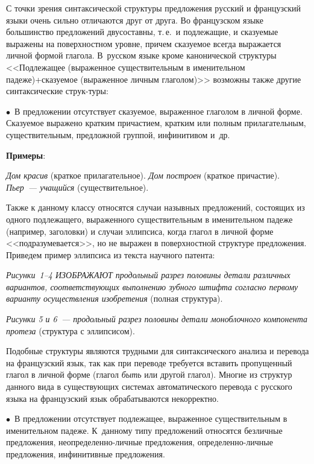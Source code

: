 \begin{multicols}{2}
     С точки зрения синтаксической структуры предложения русский и 
французский языки очень сильно отличаются друг от друга. Во французском 
языке большинство предложений двусоставны, т.\,е.\ и подлежащие, и 
сказуемые выражены на поверхностном уров\-не, причем сказуемое всегда 
выражается личной формой глагола. В~рус\-ском языке кроме канонической 
структуры <<Подлежащее (выраженное существительным в именительном 
падеже)\;+\;сказуемое (выраженное личным глаголом)>> возможны также 
другие синтаксические струк-\linebreak туры:
       
       $\bullet$~В предложении отсутствует сказуемое, выраженное глаголом в личной 
форме. Сказуемое выражено кратким причастием, кратким или полным прилагательным, 
существительным, предложной группой, инфинитивом и~др.
     
     \smallskip
     
     \noindent
     \textbf{Примеры}:
       
     \textit{Дом красив} (краткое прилагательное). \textit{Дом построен} 
(краткое причастие). \textit{Пьер~--- учащийся} (существительное).
       
       \smallskip
     
     Также к данному классу относятся случаи назывных предложений, 
состоящих из одного подлежащего, выраженного существительным в 
именительном падеже (например, заголовки) и случаи эллипсиса, когда 
глагол в личной форме <<подразумевается>>, но не выражен в 
поверхностной структуре предложения. Приведем пример эллипсиса из 
текста научного патента:
       
     \textit{Рисунки~1--4 ИЗОБРАЖАЮТ продольный разрез половины 
детали различных вариантов, соответствующих выполнению зубного 
штифта согласно первому варианту осуществления изобретения} (полная 
структура).
       
     \textit{Рисунки 5 и 6~--- продольный разрез половины детали 
моноблочного компонента протеза} (структура с эллипсисом).
     
     Подобные структуры являются трудными для синтаксического анализа 
и перевода на французский язык, так как при переводе требуется вставить 
пропущенный глагол в личной форме (глагол \textit{быть} или другой 
глагол). Многие из структур данного вида в существующих сис\-те\-мах 
автоматического перевода с русского языка на французский язык 
обрабатываются некорректно.

$\bullet$~В предложении отсутствует подлежащее, выраженное 
существительным в именительном падеже. К~данному типу предложений 
относятся безличные предложения, не\-опре\-де\-лен\-но-лич\-ные 
предложения, опре\-де\-лен\-но-лич\-ные предложения, инфинитивные 
предложения. 


\end{multicols}
